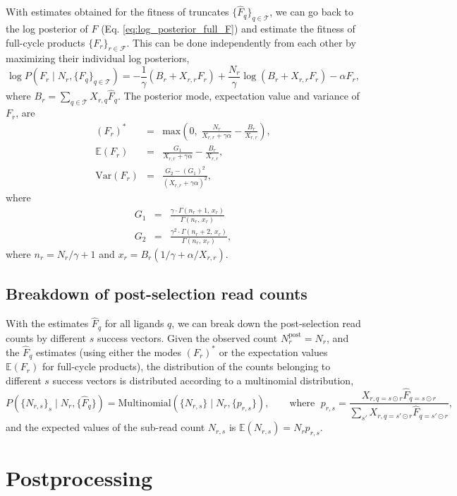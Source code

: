 \documentclass[letter,10pt,oneside]{article}
\newcommand{\bel}{\begin{equation}}
\newcommand{\eel}{\end{equation}}
\newcommand{\bal}{\begin{eqnarray}}
\newcommand{\eal}{\end{eqnarray}}
\newcommand{\+}{^\dagger}
\newcommand{\refeq}[1]{Eq. \ref{#1}}
\begin{document}
With estimates obtained for the fitness of truncates $\{\hat F_q\}_{q\in\mathcal{T}}$, we can go back to the log posterior of $F$ (\refeq{eq:log_posterior_full_F}) and estimate the fitness of full-cycle products $\{F_r\}_{r\in\mathcal{F}}$. This can be done independently from each other by maximizing their individual log posteriors, 
\bel
\label{eq:full-cycle-LP}
  \log P(F_r\;|\; N_r, \{F_q\}_{q\in\mathcal{T}}) = -\frac{1}{\gamma}(B_r + X_{r,r}F_r) + \frac{N_r}{\gamma}\log (B_r + X_{r,r}F_r) - \alpha F_r,
\eel
where $B_r = \sum_{q\in \mathcal{T}} X_{r,q} \hat F_q$. The posterior mode, expectation value and variance of $F_r$, are
\bal
  \label{eq:F_r_mode}
  (F_r)^\ast &=& \text{max}\left(0,\;\frac{N_r}{X_{r,r} + \gamma \alpha} - \frac{B_r}{X_{r,r}}\right), \\
  \label{eq:F_r_ev}
  \mathbb{E}(F_r) &=& \frac{G_1}{X_{r,r} + \gamma \alpha} - \frac{B_r}{X_{r,r}}, \\
  \label{eq:F_r_var}
  \text{Var}(F_r) &=& \frac{G_2 - (G_1)^2}{(X_{r,r} + \gamma \alpha)^2},
\eal
where
\bal
  G_1 &=& \frac{\gamma\cdot\Gamma(n_r + 1,\, x_r)}{\Gamma(n_r, \, x_r)} \\
  G_2 &=& \frac{\gamma^2\cdot\Gamma(n_r + 2,\, x_r)}{\Gamma(n_r, \, x_r)},
\eal
where $n_r = N_r / \gamma + 1$ and $x_r = B_r (1/\gamma + \alpha/X_{r,r})$.


\subsection{Breakdown of post-selection read counts}
With the estimates $\hat F_q$ for all ligands $q$, we can break down the post-selection read counts by different $s$ success vectors. Given the observed count $N_r^\text{post} = N_r$, and the $\hat F_q$ estimates (using either the modes $(F_r)^\ast$ or the expectation values $\mathbb{E}(F_r)$ for full-cycle products), the distribution of the counts belonging to different $s$ success vectors is distributed according to a multinomial distribution,
\bel
  P(\{N_{r,s}\}_s\;|\;N_r, \{\hat F_q\}) = \text{Multinomial}(\{N_{r,s}\}\;|\;N_r, \{p_{r,s}\}), \qquad \text{where }\; p_{r,s} = \frac{X_{r,q=s\odot r} \hat F_{q=s\odot r}}{\sum_{s'}X_{r,q=s'\odot r} \hat F_{q=s'\odot r}},
\eel
and the expected values of the sub-read count $N_{r,s}$ is $\mathbb{E}(N_{r,s}) = N_r p_{r,s}$.


\section{Postprocessing}
\label{sec:postprocessing}
\end{document}
